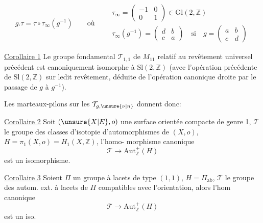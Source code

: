 \[
g.\tau=\tau\circ\tau_\infty(g^{-1})
\qquad\text{où}\qquad
\begin{gathered}
\tau_\infty=\begin{pmatrix}-1&0\\0&1\end{pmatrix}\in\mathrm{Gl}(2,\mathbb Z)\\
\tau_\infty(g^{-1})=\begin{pmatrix}d&b\\c&a\end{pmatrix}
\quad\text{si}\quad
g=\begin{pmatrix}a&b\\c&d\end{pmatrix}
\end{gathered}
\]

\uline{Corollaire 1} Le groupe fondamental $\mathcal T_{1,1}$ de
$M_{11}$ relatif au revêtement universel précédent
est canoniquement isomorphe à $\mathrm{Sl}(2,\mathbb Z)$
(avec l'opération précédente  de $\mathrm{Sl}(2,\mathbb Z)$ sur
ledit revêtement, déduite de l'opération
canonique  droite par le passage de $g$ à $g^{-1}$\unsure{\ldots}).

Les marteaux-pilons sur les $\mathcal T_{g,\unsure{\nu|n}}$
donnent donc:

\uline{Corollaire 2} Soit $(\unsure{X|E},o)$ une surface orientée
compacte de genre 1, $\mathcal T$ le groupe des
classes d'isotopie d'automorphismes de $(X,o)$,
$H=\pi_1(X,o)=H_1(X,\mathbb Z)$,   l'homo-
morphisme canonique
\[
\mathcal T\longrightarrow\mathrm{Aut}_{\mathbb Z}^+(H)
\tag{16}
\]
est un isomorphisme.

\uline{Corollaire 3} Soient $\Pi$ un groupe à lacets
de type $(1,1)$, $H=\Pi_{\mathrm{ab}}$, $\mathcal T$ le groupe des
autom. ext. à lacets de $\Pi$ compatibles avec
l'orientation, alors l'hom canonique
\[
\mathcal T\longrightarrow\mathrm{Aut}_{\mathbb Z}^+(H)
\]
est un iso.
